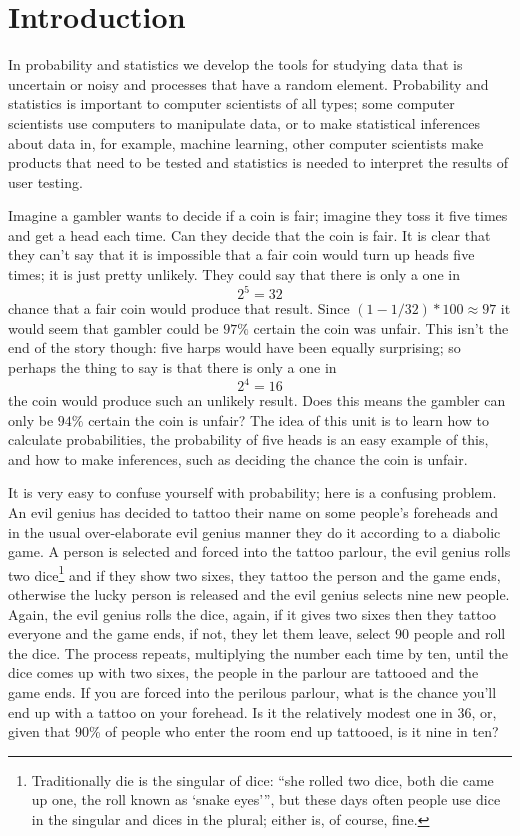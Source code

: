 \documentclass[11pt,a4paper]{scrartcl}
\begin{document}
\section*{Introduction}

In probability and statistics we develop the tools for studying data
that is uncertain or noisy and processes that have a random
element. Probability and statistics is important to computer
scientists of all types; some computer scientists use computers to
manipulate data, or to make statistical inferences about data in, for
example, machine learning, other computer scientists make products
that need to be tested and statistics is needed to interpret the
results of user testing.

Imagine a gambler wants to decide if a coin is fair; imagine they toss
it five times and get a head each time. Can they decide that the coin is
fair. It is clear that they can't say that it is
impossible that a fair coin would turn up heads five times; it is just
pretty unlikely. They could say that there is only a one in
\begin{equation}
2^{5}=32
\end{equation}
chance that a fair coin would produce that result. Since
$(1-1/32)*100\approx 97$ it would seem that gambler could be $97\%$
certain the coin was unfair. This isn't the end of the story though:
five harps would have been equally surprising; so perhaps the thing to
say is that there is only a one in
\begin{equation}
2^{4}=16
\end{equation}
the coin would produce such an unlikely result. Does this means the
gambler can only be $94\%$ certain the coin is unfair? The idea of
this unit is to learn how to calculate probabilities, the probability
of five heads is an easy example of this, and how to make inferences,
such as deciding the chance the coin is unfair.

It is very easy to confuse yourself with probability; here is a
confusing problem. An evil genius has decided to tattoo their name on
some people's foreheads and in the usual over-elaborate evil genius
manner they do it according to a diabolic game. A person is selected
and forced into the tattoo parlour, the evil genius rolls two
dice\footnote{Traditionally die is the singular of
  dice: ``she rolled two dice, both die came up one, the roll known as
  `snake eyes''', but these days often people use dice in the singular
  and dices in the plural; either is, of course, fine.} and
if they show two sixes, they tattoo the person and the game ends,
otherwise the lucky person is released and the evil genius selects
nine new people. Again, the evil genius rolls the dice, again, if it
gives two sixes then they tattoo everyone and the game ends, if not,
they let them leave, select 90 people and roll the dice. The process
repeats, multiplying the number each time by ten, until the dice comes
up with two sixes, the people in the parlour are tattooed and the game
ends. If you are forced into the perilous parlour, what is the chance you'll
end up with a tattoo on your forehead. Is it the relatively modest one
in 36, or, given that 90\% of people who enter the room end up
tattooed, is it nine in ten?
\end{document}
